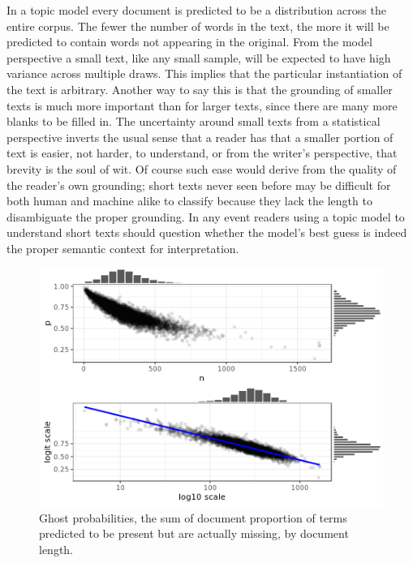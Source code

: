 \documentclass[]{book}
\theoremstyle{definition}
\theoremstyle{definition}
\theoremstyle{definition}
\theoremstyle{remark}
\begin{document}
In a topic model every document is predicted to be a distribution across
the entire corpus. The fewer the number of words in the text, the more
it will be predicted to contain words not appearing in the original.
From the model perspective a small text, like any small sample, will be
expected to have high variance across multiple draws. This implies that
the particular instantiation of the text is arbitrary. Another way to
say this is that the grounding of smaller texts is much more important
than for larger texts, since there are many more blanks to be filled in.
The uncertainty around small texts from a statistical perspective
inverts the usual sense that a reader has that a smaller portion of text
is easier, not harder, to understand, or from the writer's perspective,
that brevity is the soul of wit. Of course such ease would derive from
the quality of the reader's own grounding; short texts never seen before
may be difficult for both human and machine alike to classify because
they lack the length to disambiguate the proper grounding. In any event
readers using a topic model to understand short texts should question
whether the model's best guess is indeed the proper semantic context for
interpretation.

\begin{figure}

{\centering \includegraphics[width=0.9\linewidth]{03_files/figure-latex/ghostN-1} 

}

\caption{Ghost probabilities, the sum of document proportion of terms predicted to be present but are actually missing, by document length.}\label{fig:ghostN}
\end{figure}
\end{document}
